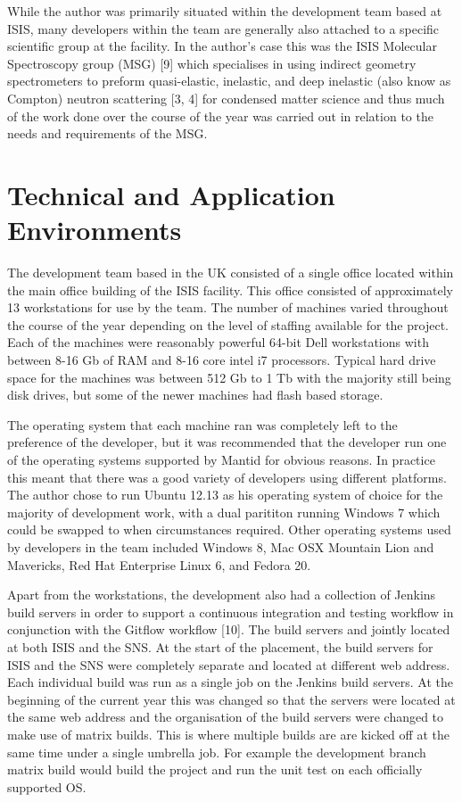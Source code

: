 \documentclass[paper=a4, fontsize=11pt]{scrartcl}	%
\numberwithin{equation}{section}															%
\numberwithin{figure}{section}																%
\numberwithin{table}{section}
\begin{document}
While the author was primarily situated within the development team
based at ISIS, many developers within the team are generally also
attached to a specific scientific group at the facility. In the author's
case this was the ISIS Molecular Spectroscopy group (MSG) {[}9{]} which
specialises in using indirect geometry spectrometers to preform
quasi-elastic, inelastic, and deep inelastic (also know as Compton)
neutron scattering {[}3, 4{]} for condensed matter science and thus much
of the work done over the course of the year was carried out in relation
to the needs and requirements of the MSG.

\section{Technical and Application
Environments}\label{technical-and-application-environments}

The development team based in the UK consisted of a single office
located within the main office building of the ISIS facility. This
office consisted of approximately 13 workstations for use by the team.
The number of machines varied throughout the course of the year
depending on the level of staffing available for the project. Each of
the machines were reasonably powerful 64-bit Dell workstations with
between 8-16 Gb of RAM and 8-16 core intel i7 processors. Typical hard
drive space for the machines was between 512 Gb to 1 Tb with the
majority still being disk drives, but some of the newer machines had
flash based storage.

The operating system that each machine ran was completely left to the
preference of the developer, but it was recommended that the developer
run one of the operating systems supported by Mantid for obvious
reasons. In practice this meant that there was a good variety of
developers using different platforms. The author chose to run Ubuntu
12.13 as his operating system of choice for the majority of development
work, with a dual parititon running Windows 7 which could be swapped to
when circumstances required. Other operating systems used by developers
in the team included Windows 8, Mac OSX Mountain Lion and Mavericks, Red
Hat Enterprise Linux 6, and Fedora 20.

Apart from the workstations, the development also had a collection of
Jenkins build servers in order to support a continuous integration and
testing workflow in conjunction with the Gitflow workflow {[}10{]}. The
build servers and jointly located at both ISIS and the SNS. At the start
of the placement, the build servers for ISIS and the SNS were completely
separate and located at different web address. Each individual build was
run as a single job on the Jenkins build servers. At the beginning of
the current year this was changed so that the servers were located at
the same web address and the organisation of the build servers were
changed to make use of matrix builds. This is where multiple builds are
are kicked off at the same time under a single umbrella job. For example
the development branch matrix build would build the project and run the
unit test on each officially supported OS.
\end{document}
